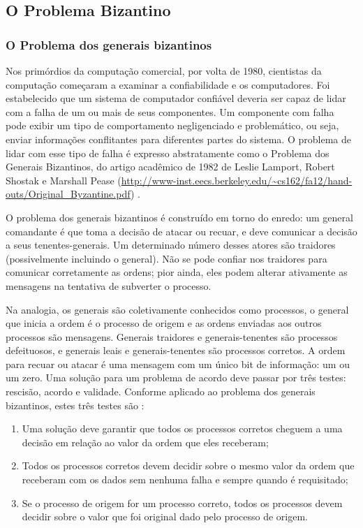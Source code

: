     \subsection{O Problema Bizantino}
    
        \subsubsection{O Problema dos generais bizantinos}
        
           Nos primórdios da computação comercial, por volta de 1980, cientistas da computação começaram a examinar a confiabilidade e os computadores. Foi estabelecido que um sistema de computador confiável deveria ser capaz de lidar com a falha de um ou mais de seus componentes. Um componente com falha pode exibir um tipo de comportamento negligenciado e problemático, ou seja, enviar informações conflitantes para diferentes partes do sistema. O problema de lidar com esse tipo de falha é expresso abstratamente como o Problema dos Generais Bizantinos, do artigo acadêmico de 1982 de Leslie Lamport, Robert Shostak e Marshall Pease (\url{http://www-inst.eecs.berkeley.edu/~cs162/fa12/hand-outs/Original_Byzantine.pdf}) \cite{blockchain_pratical_guide}.
           
           O problema dos generais bizantinos é construído em torno do enredo: um general comandante é que toma a decisão de atacar ou recuar, e deve comunicar a decisão a seus tenentes-generais. Um determinado número desses atores são traidores (possivelmente incluindo o general). Não se pode confiar nos traidores para comunicar corretamente as ordens; pior ainda, eles podem alterar ativamente as mensagens na tentativa de subverter o processo\cite{blockchain_pratical_guide}.
    
            Na analogia, os generais são coletivamente conhecidos como processos, o general que inicia a ordem é o processo de origem e as ordens enviadas aos outros processos são mensagens. Generais traidores e generais-tenentes são processos defeituosos, e generais leais e generais-tenentes são processos corretos. A ordem para recuar ou atacar é uma mensagem com um único bit de informação: um ou um zero. Uma solução para um problema de acordo deve passar por três testes: rescisão, acordo e validade. Conforme aplicado ao problema dos generais bizantinos, estes três testes são \cite{blockchain_pratical_guide}:
    
               \begin{enumerate}
                    \item Uma solução deve garantir que todos os processos corretos cheguem a uma decisão em relação ao valor da ordem que eles receberam;
                    \item Todos os processos corretos devem decidir sobre o mesmo valor da ordem que receberam com os dados sem nenhuma falha e sempre quando é requisitado;
                    \item Se o processo de origem for um processo correto, todos os processos devem decidir sobre o valor que foi original dado pelo processo de origem.
                \end{enumerate}
    
